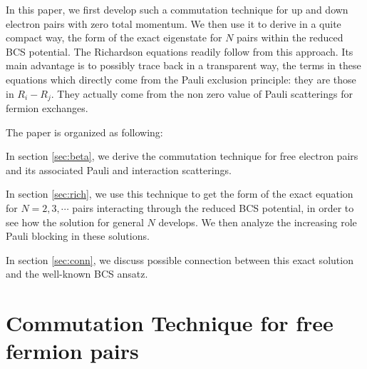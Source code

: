 \documentclass[aps,prb,amsmath,amssymb,superscriptaddress,twocolumn]{revtex4-1}
\begin{document}
In this paper, we first develop such a commutation technique for up and down electron pairs with zero total momentum.  We then use it to derive in a quite compact way, the form of the exact eigenstate for $N$ pairs within the reduced BCS potential. The Richardson equations readily follow from this approach.  Its main advantage is to possibly trace back in a transparent way, the terms in these equations which directly come from the Pauli exclusion principle: they are those in $R_i-R_j$. They actually come from the non zero value of Pauli scatterings for fermion exchanges. 

The paper is organized as following:

In section \ref{sec:beta}, we derive the commutation technique for free electron pairs and its associated Pauli and interaction scatterings.  

In section \ref{sec:rich}, we use this technique to get the form of the exact equation for $N=2,3,\cdots$ pairs interacting through the reduced BCS potential, in order to see how the solution for general $N$ develops. We then analyze the increasing role Pauli blocking in these solutions.

In section \ref{sec:conn}, we discuss possible connection between this exact solution and the well-known BCS ansatz.  
\section{Commutation Technique for free fermion pairs\label{sec:beta}}
\end{document}

